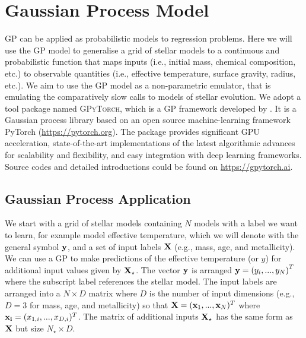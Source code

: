 \section{Gaussian Process Model}\label{sec:gpmodel}

GP can be applied as probabilistic models to regression problems. Here we will use the GP model to generalise a grid of stellar models to a continuous and probabilistic function that maps inputs (i.e., initial mass, chemical composition, etc.) to observable quantities (i.e., effective temperature, surface gravity, radius, etc.).  We aim to use the GP model as a non-parametric emulator, that is emulating the comparatively slow calls to models of stellar evolution. 
%
We adopt a tool package named \textsc{GPyTorch}, which is a GP framework developed by \citet{gardner2018gpytorch}. It is a Gaussian process library based on an open source machine-learning framework PyTorch (\url{https://pytorch.org}). The package provides significant GPU acceleration, state-of-the-art implementations of the latest algorithmic advances for scalability and flexibility, and easy integration with deep learning frameworks. Source codes and detailed introductions could be found on \url{https://gpytorch.ai}.

\subsection{Gaussian Process Application}

We start with a grid of stellar models containing $N$ models with a label we want to learn, for example model effective temperature, which we will denote with the general symbol $\bf y$, and a set of input labels $\bf X$ (e.g., mass, age, and metallicity).  We can use a GP to make predictions of the effective temperature (or $y$) for additional input values given by $\bf X_{\star}$.  The vector $\bf y$ is arranged ${\bf y} = \left(y_{i}, ... ,y_{N} \right)^{T}$ where the subscript label references the stellar model.  The input labels are arranged into a $N \times D$ matrix where $D$ is the number of input dimensions (e.g., $D=3$ for mass, age, and metallicity) so that ${\bf X} = ({\bf x}_{1}, ..., {\bf x}_{N})^{T}$ where ${\bf x_{i}} = (x_{1, i}, ..., x_{D, i})^{T}$.  The matrix of additional inputs $\bf X_{\star}$ has the same form as $\bf X$ but size $N_{\star} \times D$.

